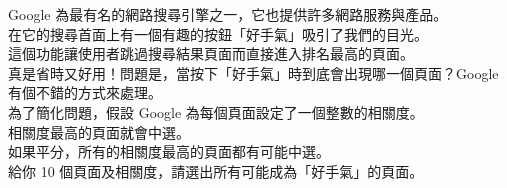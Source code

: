 Google 為最有名的網路搜尋引擎之一，它也提供許多網路服務與產品。\\
在它的搜尋首面上有一個有趣的按鈕「好手氣」吸引了我們的目光。\\
這個功能讓使用者跳過搜尋結果頁面而直接進入排名最高的頁面。\\
真是省時又好用！問題是，當按下「好手氣」時到底會出現哪一個頁面？Google 有個不錯的方式來處理。\\
為了簡化問題，假設 Google 為每個頁面設定了一個整數的相關度。\\
相關度最高的頁面就會中選。\\
如果平分，所有的相關度最高的頁面都有可能中選。\\
給你 10 個頁面及相關度，請選出所有可能成為「好手氣」的頁面。\\
